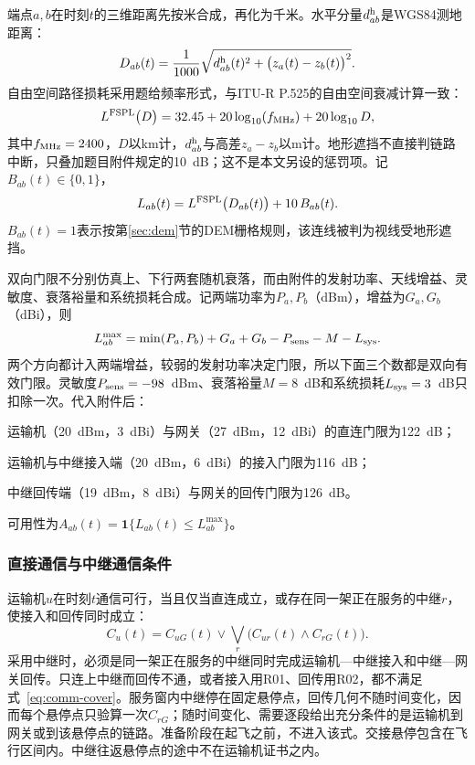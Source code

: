 端点$a,b$在时刻$t$的三维距离先按米合成，再化为千米。水平分量$d_{ab}^{\rm h}$是WGS84测地距离：
\begin{equation}
D_{ab}(t)=\frac{1}{1000}\sqrt{d_{ab}^{\rm h}(t)^2+\bigl(z_a(t)-z_b(t)\bigr)^2}.
\label{eq:distance3d}
\end{equation}
自由空间路径损耗采用题给频率形式，与ITU-R P.525的自由空间衰减计算一致\cite{itur}：
\begin{equation}
L^{\rm FSPL}\bigl(D\bigr)=32.45+20\log_{10}(f_{\rm MHz})+20\log_{10}D,
\label{eq:fspl}
\end{equation}
其中$f_{\rm MHz}=2400$，$D$以km计，$d_{ab}^{\rm h}$与高差$z_a-z_b$以m计。地形遮挡不直接判链路中断，只叠加题目附件规定的10~dB；这不是本文另设的惩罚项。记$B_{ab}(t)\in\{0,1\}$，
\begin{equation}
L_{ab}(t)=L^{\rm FSPL}\bigl(D_{ab}(t)\bigr)+10\,B_{ab}(t).
\label{eq:link-loss}
\end{equation}
$B_{ab}(t)=1$表示按第\ref{sec:dem}节的DEM栅格规则，该连线被判为视线受地形遮挡。

双向门限不分别仿真上、下行两套随机衰落，而由附件的发射功率、天线增益、灵敏度、衰落裕量和系统损耗合成。记两端功率为$P_a,P_b$（dBm），增益为$G_a,G_b$（dBi），则
\begin{equation}
L_{ab}^{\max}
=\min(P_a,P_b)+G_a+G_b-P_{\rm sens}-M-L_{\rm sys}.
\label{eq:threshold}
\end{equation}
两个方向都计入两端增益，较弱的发射功率决定门限，所以下面三个数都是双向有效门限。灵敏度$P_{\rm sens}=-98$~dBm、衰落裕量$M=8$~dB和系统损耗$L_{\rm sys}=3$~dB只扣除一次。代入附件后：

运输机（20~dBm，3~dBi）与网关（27~dBm，12~dBi）的直连门限为122~dB；

运输机与中继接入端（20~dBm，6~dBi）的接入门限为116~dB；

中继回传端（19~dBm，8~dBi）与网关的回传门限为126~dB。

可用性为$A_{ab}(t)=\mathbf{1}\{L_{ab}(t)\le L_{ab}^{\max}\}$。

\subsubsection{直接通信与中继通信条件}

运输机$u$在时刻$t$通信可行，当且仅当直连成立，或存在同一架正在服务的中继$r$，使接入和回传同时成立：
\begin{equation}
C_u(t)=C_{uG}(t)\lor\bigvee_r\bigl(C_{ur}(t)\land C_{rG}(t)\bigr).
\label{eq:comm-cover}
\end{equation}
采用中继时，必须是同一架正在服务的中继同时完成运输机—中继接入和中继—网关回传。只连上中继而回传不通，或者接入用R01、回传用R02，都不满足式~\eqref{eq:comm-cover}。服务窗内中继停在固定悬停点，回传几何不随时间变化，因而每个悬停点只验算一次$C_{rG}$；随时间变化、需要逐段给出充分条件的是运输机到网关或到该悬停点的链路。准备阶段在起飞之前，不进入该式。交接悬停包含在飞行区间内。中继往返悬停点的途中不在运输机证书之内。

